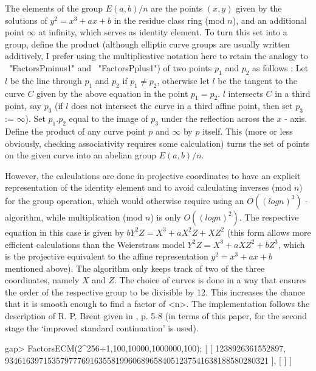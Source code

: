 The elements of the group $E(a,b)/n$ are the points $(x,y)$ given by the
solutions of $y^2 = x^3 + ax + b$ in the residue class ring (mod $n$),
and an additional point $\infty$ at infinity, which serves as 
identity element. 
To turn this set into a group, define the product 
(although elliptic curve groups are usually written additively,
I prefer using the multiplicative notation here to retain the analogy
to ~"FactorsPminus1" and ~"FactorsPplus1") of two points
$p_1$ and $p_2$ as follows :
Let $l$ be the line through $p_1$ and $p_2$ if $p_1 \neq p_2$,
otherwise let $l$ be the tangent to the curve $C$ given by the 
above equation in the point $p_1 = p_2$.
$l$ intersects $C$ in a third point, say $p_3$ 
(if $l$ does not intersect the curve in a
third affine point, then set $p_3$ := $\infty$). 
Set $p_1.p_2$ equal to the image of $p_3$ under
the reflection across the $x$ - axis.
Define the product of any curve point $p$ and $\infty$ by $p$ itself.
This (more or less obviously, checking associativity requires some
calculation) turns the set of points on the given curve
into an abelian group $E(a,b)/n$.

However, the calculations are done in
projective coordinates to have an explicit representation of the 
identity element and to avoid calculating inverses (mod $n$)
for the group operation, which would otherwise require using an 
$O((log n)^3)$ - algorithm, while multiplication (mod $n$) is only 
$O((log n)^2)$. The respective equation in this case is given by 
$bY^2Z = X^3 + aX^2Z + XZ^2$ (this form allows more efficient
calculations than the Weierstrass model 
$Y^2Z = X^3 + aXZ^2 + bZ^3$, which is the projective equivalent to
the affine representation $y^2 = x^3 + ax + b$ mentioned above).
The algorithm only keeps track of two of the three coordinates,
namely $X$ and $Z$.
The choice of curves is done in a way that ensures the order of
the respective group to be divisible by 12. This increases the
chance that it is smooth enough to find a factor of <n>.
The implementation follows the description of R. P. Brent given in
\cite{BrentsECM}, p. 5-8 (in terms of this paper,
for the second stage the \lq improved standard continuation' is used).

\beginexample
gap> FactorsECM(2^256+1,100,10000,1000000,100);
[ [ 1238926361552897, 
      93461639715357977769163558199606896584051237541638188580280321 ], [  ] ]
\endexample


